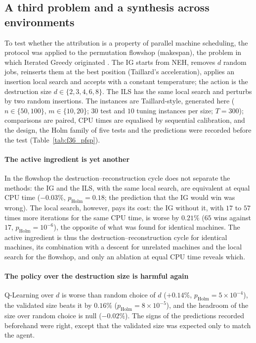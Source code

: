 \subsection{A third problem and a synthesis across environments}
\label{sec:pfsp}

To test whether the attribution is a property of parallel machine scheduling, the protocol was applied to the permutation flowshop (makespan), the problem in which Iterated Greedy originated \citep{RuizStutzle2007}.
The IG starts from NEH, removes $d$ random jobs, reinserts them at the best position (Taillard's acceleration), applies an insertion local search and accepts with a constant temperature; the action is the
destruction size $d\in\{2,3,4,6,8\}$. The ILS has the same local search and perturbs by two random insertions. The instances are Taillard-style, generated here ($n\in\{50,100\}$, $m\in\{10,20\}$; $30$ test and $10$ tuning
instances per size; $T=300$); comparisons are paired, CPU times are equalised by sequential calibration, and the design, the Holm family of five tests and the predictions were recorded before the test (Table~\ref{tab:f36_pfsp}).

\paragraph{The active ingredient is yet another}
In the flowshop the destruction--reconstruction cycle does not separate the methods: the IG and the ILS, with the same local search, are equivalent at equal CPU time ($-0.03\%$, $p_{\mathrm{Holm}}=0.18$; the
prediction that the IG would win was wrong). The local search, however, pays its cost: the IG without it, with $17$ to $57$ times more iterations for the same CPU time, is worse by $0.21\%$ ($65$ wins against $17$,
$p_{\mathrm{Holm}}=10^{-6}$), the opposite of what was found for identical machines. The active ingredient is thus the destruction--reconstruction cycle for identical machines, its combination with a descent for unrelated
machines and the local search for the flowshop, and only an ablation at equal CPU time reveals which.

\paragraph{The policy over the destruction size is harmful again}
Q-Learning over $d$ is worse than random choice of $d$ ($+0.14\%$, $p_{\mathrm{Holm}}=5\times10^{-4}$), the validated size beats it by $0.16\%$ ($p_{\mathrm{Holm}}=8\times10^{-5}$), and the headroom of the size over
random choice is null ($-0.02\%$). The signs of the predictions recorded beforehand were right, except that the validated size was expected only to match the agent.

